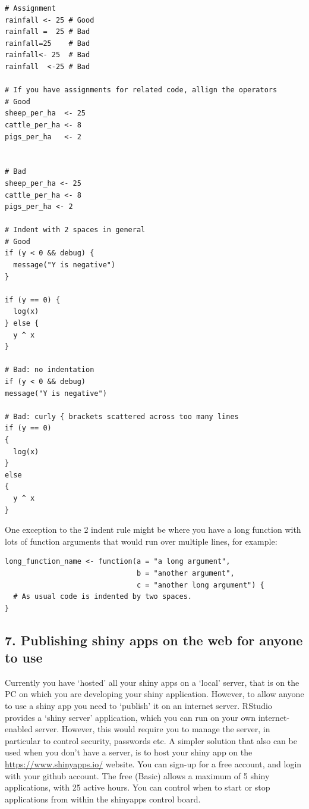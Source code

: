 \documentclass[]{article}
\begin{document}
\begin{verbatim}
# Assignment
rainfall <- 25 # Good
rainfall =  25 # Bad
rainfall=25    # Bad
rainfall<- 25  # Bad
rainfall  <-25 # Bad

# If you have assignments for related code, allign the operators
# Good
sheep_per_ha  <- 25
cattle_per_ha <- 8
pigs_per_ha   <- 2


# Bad
sheep_per_ha <- 25
cattle_per_ha <- 8
pigs_per_ha <- 2

# Indent with 2 spaces in general
# Good
if (y < 0 && debug) {
  message("Y is negative")
}

if (y == 0) {
  log(x)
} else {
  y ^ x
}

# Bad: no indentation
if (y < 0 && debug)
message("Y is negative")

# Bad: curly { brackets scattered across too many lines
if (y == 0)
{
  log(x)
} 
else
{
  y ^ x
}
\end{verbatim}

One exception to the 2 indent rule might be where you have a long
function with lots of function arguments that would run over multiple
lines, for example:

\begin{verbatim}
long_function_name <- function(a = "a long argument", 
                               b = "another argument",
                               c = "another long argument") {
  # As usual code is indented by two spaces.
}
\end{verbatim}

\subsection{7. Publishing shiny apps on the web for anyone to
use}\label{publishing-shiny-apps-on-the-web-for-anyone-to-use}

Currently you have `hosted' all your shiny apps on a `local' server,
that is on the PC on which you are developing your shiny application.
However, to allow anyone to use a shiny app you need to `publish' it on
an internet server. RStudio provides a `shiny server' application, which
you can run on your own internet-enabled server. However, this would
require you to manage the server, in particular to control security,
passwords etc. A simpler solution that also can be used when you don't
have a server, is to host your shiny app on the
\url{https://www.shinyapps.io/} website. You can sign-up for a free
account, and login with your github account. The free (Basic) allows a
maximum of 5 shiny applications, with 25 active hours. You can control
when to start or stop applications from within the shinyapps control
board.
\end{document}
